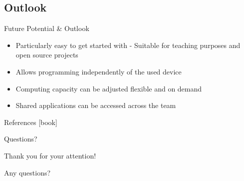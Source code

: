 \documentclass{beamer}
\begin{document}
\subsection{Outlook}
\begin{frame}{Future Potential \& Outlook}
  \begin{itemize}
    \large
    \setlength\itemsep{0.8em}
    \item Particularly easy to get started with - Suitable for teaching purposes and open source projects
    \item Allows programming independently of the used device
    \item Computing capacity can be adjusted flexible and on demand
    \item Shared applications can be accessed across the team
  \end{itemize}
\end{frame}


\appendix
\begin{frame}[allowframebreaks]{References}
  \small
  [book]
  {}
  
\end{frame}

\begin{frame}{Questions?}
  \begin{center}
    Thank you for your attention!

    Any questions?
  \end{center}
\end{frame}
\end{document}
